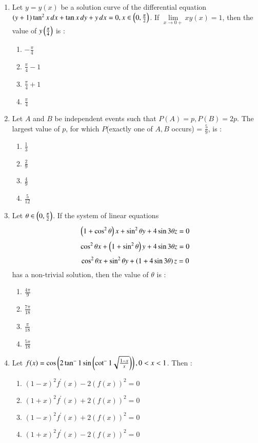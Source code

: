 \documentclass[journal,12pt,twocolumn]{IEEEtran}
\theoremstyle{remark}
\begin{document}
\begin{enumerate}
    \item Let $y=y(x)$ be a solution curve of the differential equation $(y+1)\tan^2{x}\,dx + \tan{x}\,dy + y\,dx=0, x\in\left(0,\frac{\pi}{2}\right)$. If $\lim\limits_{x\to0+}xy(x)=1$, then the value of $y\left(\frac{\pi}{4}\right)$ is :
        \begin{enumerate}
            \item $-\frac{\pi}{4}$
            \item $\frac{\pi}{4}-1$
            \item $\frac{\pi}{4}+1$
            \item $\frac{\pi}{4}$
        \end{enumerate}

    \item Let $A$ and $B$ be independent events such that $P(A) = p, P(B) = 2p$. The largest value of $p$, for which $P$(exactly one of $A, B$ occurs) = $\frac{5}{9}$, is :
        \begin{enumerate}
            \item $\frac{1}{3}$
            \item $\frac{2}{9}$
            \item $\frac{4}{9}$
            \item $\frac{5}{12}$
        \end{enumerate}

    \item Let $\theta\in\left(0,\frac{\pi}{2}\right)$. If the system of linear equations
            $$\left(1+\cos^2{\theta}\right)x+\sin^2{\theta}y+4\sin{3\theta}z=0$$
            $$\cos^2{\theta}x+\left(1+\sin^2{\theta}\right)y+4\sin{3\theta}z=0$$
            $$\cos^2{\theta}x+\sin^2{\theta}y+\left(1+4\sin{3\theta}\right)z=0$$
        has a non-trivial solution, then the value of $\theta$ is :
        \begin{enumerate}
            \item $\frac{4\pi}{9}$
            \item $\frac{7\pi}{18}$
            \item $\frac{\pi}{18}$
            \item $\frac{5\pi}{18}$
        \end{enumerate}

    \item Let $f(x)=\cos\left(2\tan^-1\sin\left(\cot^-1\sqrt{\frac{1-x}{x}}\right)\right), 0<x<1$. Then :
        \begin{enumerate}
            \item $(1-x)^2f^\prime(x)-2(f(x))^2=0$
            \item $(1+x)^2f^\prime(x)+2(f(x))^2=0$
            \item $(1-x)^2f^\prime(x)+2(f(x))^2=0$
            \item $(1+x)^2f^\prime(x)-2(f(x))^2=0$
        \end{enumerate}



\end{enumerate}
\end{document}
